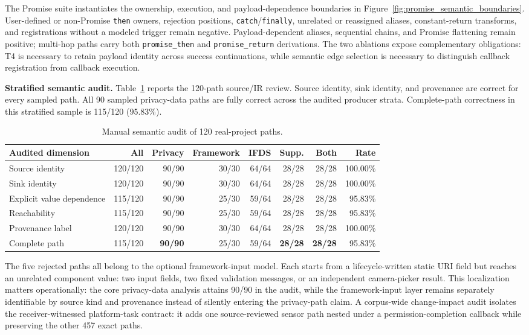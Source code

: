 The Promise suite instantiates the ownership, execution, and payload-dependence boundaries in Figure~\ref{fig:promise_semantic_boundaries}. User-defined or non-Promise \texttt{then} owners, rejection positions, \texttt{catch}/\texttt{finally}, unrelated or reassigned aliases, constant-return transforms, and registrations without a modeled trigger remain negative. Payload-dependent aliases, sequential chains, and Promise flattening remain positive; multi-hop paths carry both \texttt{promise\_then} and \texttt{promise\_return} derivations. The two ablations expose complementary obligations: T4 is necessary to retain payload identity across success continuations, while semantic edge selection is necessary to distinguish callback registration from callback execution.

\textbf{Stratified semantic audit.}
Table~\ref{tab:semantic_path_audit} reports the 120-path source/IR review. Source identity, sink identity, and provenance are correct for every sampled path. All 90 sampled privacy-data paths are fully correct across the audited producer strata. Complete-path correctness in this stratified sample is 115/120 (95.83\%).

\begin{table}[tbp]
\centering
\caption{Manual semantic audit of 120 real-project paths.}
\label{tab:semantic_path_audit}
\papertablestyle
\setlength{\tabcolsep}{2.8pt}
\begin{tabular*}{\columnwidth}{@{\extracolsep{\fill}}lrrrrrrr@{}}
\toprule
Audited dimension & All & Privacy & Framework & IFDS & Supp. & Both & Rate \\
\midrule
Source identity & 120/120 & 90/90 & 30/30 & 64/64 & 28/28 & 28/28 & 100.00\% \\
Sink identity & 120/120 & 90/90 & 30/30 & 64/64 & 28/28 & 28/28 & 100.00\% \\
Explicit value dependence & 115/120 & 90/90 & 25/30 & 59/64 & 28/28 & 28/28 & 95.83\% \\
Reachability & 115/120 & 90/90 & 25/30 & 59/64 & 28/28 & 28/28 & 95.83\% \\
Provenance label & 120/120 & 90/90 & 30/30 & 64/64 & 28/28 & 28/28 & 100.00\% \\
\midrule
Complete path & 115/120 & \textbf{90/90} & 25/30 & 59/64 & \textbf{28/28} & \textbf{28/28} & 95.83\% \\
\bottomrule
\end{tabular*}
\end{table}

The five rejected paths all belong to the optional framework-input model. Each starts from a lifecycle-written static URI field but reaches an unrelated component value: two input fields, two fixed validation messages, or an independent camera-picker result. This localization matters operationally: the core privacy-data analysis attains 90/90 in the audit, while the framework-input layer remains separately identifiable by source kind and provenance instead of silently entering the privacy-path claim. A corpus-wide change-impact audit isolates the receiver-witnessed platform-task contract: it adds one source-reviewed sensor path nested under a permission-completion callback while preserving the other 457 exact paths.

